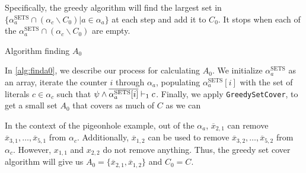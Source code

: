 Specifically, the greedy algorithm will find the largest set in $\{\alpha_a^\mathrm{SETS} \cap (\alpha_c \backslash C_0) | a \in \alpha_a \}$ at each step and add it to $C_0$. It stops when each of the $\alpha_a^\mathrm{SETS} \cap (\alpha_c \backslash C_0)$ are empty.


\begin{algorithm}
    \caption{Algorithm finding $A_0$}\label{alg:finda0}
    \SetAlgoNoLine
\end{algorithm}

In \autoref{alg:finda0}, we describe our process for calculating $A_0$. 
We initialize $\alpha_a^\mathrm{SETS}$ as an array, iterate the counter
$i$ through $\alpha_a$, populating $\alpha_a^\mathrm{SETS}[i]$ with the set of literals
$c \in \alpha_c$ such that $\psi \land \overline{\alpha_a^\mathrm{SETS}[i]} \vdash_1 c$. Finally, we apply
\texttt{GreedySetCover}, to get a small set $A_0$ that covers as much of $C$ as we can

In the context of the pigeonhole example, out of the $\alpha_a$,
$\overline{x}_{2, 1}$ can remove $\overline{x}_{3, 1}, \ldots, \overline{x}_{5,
1}$ from $\alpha_c$. Additionally, $\overline{x}_{1, 2}$ can be used to remove
$\overline{x}_{3, 2}, \ldots, \overline{x}_{5, 2}$ from $\alpha_c$. However,
$x_{1, 1}$ and $x_{2, 2}$ do not remove anything. Thus, the greedy set cover
algorithm will give us $A_0 = \{\overline{x}_{2, 1}, \overline{x}_{1, 2}\}$ and
$C_0 = C$.




